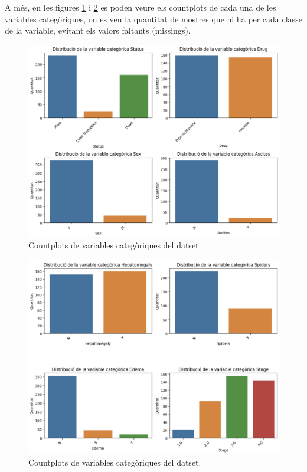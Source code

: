 A més, en les figures \ref{fig:cat-countplots-1} i \ref{fig:cat-countplots-2} es poden veure els countplots de cada una de les variables categòriques, on es veu la quantitat de mostres que hi ha per cada classe de la variable, evitant els valors faltants (missings).

\begin{figure}[H]
    \centering
    \includegraphics[width=\linewidth]{img/cat-countplots-1.png}
    \caption{Countplots de variables categòriques del datset.}
    \label{fig:cat-countplots-1}
\end{figure}
\begin{figure}[H]
    \centering
    \includegraphics[width=\linewidth]{img/cat-countplots-2.png}
    \caption{Countplots de variables categòriques del datset.}
    \label{fig:cat-countplots-2}
\end{figure}

